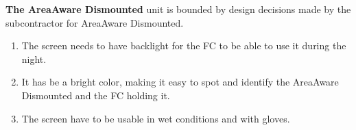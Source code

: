 \noindent \textbf{The AreaAware Dismounted} unit is bounded by design decisions made by the subcontractor for AreaAware Dismounted.
\begin{enumerate}[label=D-D\arabic*,leftmargin=1.1cm]
  \item The screen needs to have backlight for the FC to be able to use it during the night.
  \item It has be a bright color, making it easy to spot and identify the AreaAware Dismounted and the FC holding it.
  \item The screen have to be usable in wet conditions and with gloves.
\end{enumerate}